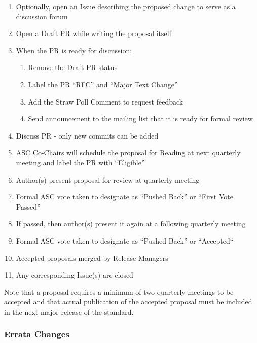 \documentclass{article}
\providecommand{\tightlist}{%
  \setlength{\itemsep}{0pt}\setlength{\parskip}{0pt}}
\begin{document}
\begin{enumerate}
\def\labelenumi{\arabic{enumi}.}
\tightlist
\item
  Optionally, open an Issue describing the proposed change to serve as a discussion
  forum
\item
  Open a Draft PR while writing the proposal itself
\item
  When the PR is ready for discussion:
  \begin{enumerate}
  \def\labelenumi{\arabic{enumi}.}
  \tightlist
  \item 
    Remove the Draft PR status
  \item
    Label the PR ``RFC'' and ``Major Text Change''
  \item
    Add the Straw Poll Comment to request feedback
  \item
    Send announcement to the mailing list that it is ready for formal review
  \end{enumerate}
\item
  Discuss PR - only new commits can be added
\item
  ASC Co-Chairs will schedule the proposal for Reading at next quarterly
  meeting and label the PR with ``Eligible''
\item
  Author(s) present proposal for review at quarterly meeting
\item
  Formal ASC vote taken to designate as ``Pushed Back'' or ``First Vote Passed''
\item
  If passed, then author(s) present it again at a following quarterly meeting
\item
  Formal ASC vote taken to designate as ``Pushed Back'' or ``Accepted``
\item
  Accepted proposals merged by Release Managers
\item
  Any corresponding Issue(s) are closed
\end{enumerate}

Note that a proposal requires a minimum of two quarterly meetings to be
accepted and that actual publication of the accepted proposal must be
included in the next major release of the standard.

\hypertarget{errata-changes}{%
\subsubsection{Errata Changes}%
\label{errata-changes}}
\end{document}
